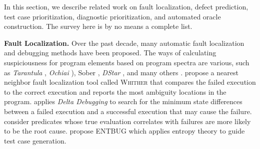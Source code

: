 In this section, we describe related work on fault localization, defect prediction, test case prioritization,  diagnostic prioritization, and automated oracle construction. The survey here is by no means a complete list.



\smallskip\noindent
\textbf{Fault} \textbf{Localization.} Over the past decade, many automatic fault localization and debugging methods have been proposed.
The ways of calculating suspiciousness for program elements based on program spectra are various, 
such as {\em Tarantula} \citep{JHS02,JH05}, {\em Ochiai} \citep{Abreu:2009.jss}), {\sc Sober} \citep{LYFHM05}, {\em DStar} \citep{Wong2014}, and many others \cite[e.g.][]{Xie2013,Naish2011,Lucia2014,Jiang2007}.
\cite{RR03} propose a nearest neighbor fault localization tool called \textsc{Whither} that compares the failed execution
to the correct execution and reports the most ambiguity  locations in the program.
\cite{Zeller2002a} applies {\em Delta Debugging} to search for the minimum state differences between a failed execution and a successful execution that may cause the failure. \cite{LAZJ03} consider predicates whose true evaluation correlates with failures are more likely to be the root cause.
\cite{campos2013entropy} propose ENTBUG which applies entropy theory to guide test case generation.



